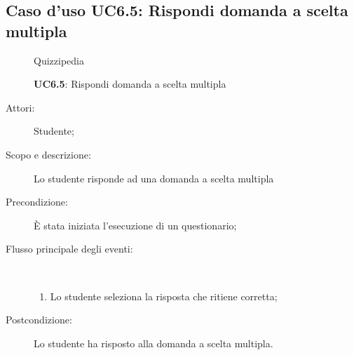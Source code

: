\subsection{Caso d'uso UC6.5: Rispondi domanda a scelta multipla}
	\begin{figure}[H]
		\centering
		\begin{resizedtikzpicture}{\textwidth}
		\begin{umlsystem}[x=0, fill=lightgray!20]{Quizzipedia}
		\end{umlsystem}
		\end{resizedtikzpicture}
		\caption{\textbf{UC6.5}: Rispondi domanda a scelta multipla}
		\label{UC6.5}
	\end{figure}
\begin{description}
\item[Attori:] Studente;
\item[Scopo e descrizione:] Lo studente risponde ad una domanda a scelta multipla
      \item[Precondizione:] È stata iniziata l'esecuzione di un questionario;

        \item[Flusso principale degli eventi:] \ 
 \begin{enumerate}
          \item Lo studente seleziona la risposta che ritiene corretta;

      \end{enumerate}
    \item[Postcondizione:] Lo studente ha risposto alla domanda a scelta multipla.
  \end{description}
\hypertarget{UC6.6}{}

